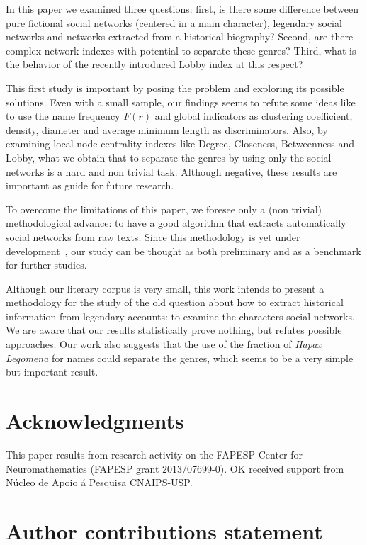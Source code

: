 \documentclass[review]{elsarticle}
\begin{document}
In this paper we examined  three questions:  first, is there
some difference  between  pure  fictional  social  networks
(centered in a main character), legendary social networks
and  networks  extracted from  a historical  biography?
Second, are there complex network indexes 
with potential to separate these genres?  Third,  what  is the
behavior of the  recently introduced Lobby index at this respect?

This first study is important by posing the problem and
exploring its possible solutions.
Even with a small sample, our findings seems 
to refute some ideas like to use the
name frequency $F(r)$ and global indicators as 
clustering coefficient, density, 
diameter and average minimum length as discriminators. 
Also, by examining local node centrality indexes like 
Degree, Closeness, Betweenness and Lobby,
what we obtain that to separate the genres by
using only the social networks is a hard and non trivial task.
Although negative, these results are important as guide
for future research.

To overcome the limitations of this paper, 
we foresee only a (non trivial)
methodological advance: to have a good algorithm that 
extracts automatically social networks from raw texts. 
Since this methodology is yet under
development~\cite{elson2010extracting,grayson2016sense}, 
our study can be thought as both 
preliminary and as a benchmark for further studies.

Although our literary corpus is very small, this work
intends to present a methodology for the study of the
old question about how to extract historical information from
legendary accounts: to examine the characters social networks. 
We are aware that our results statistically 
prove nothing, but refutes possible approaches.
Our work also suggests  that the
use of the fraction of \emph{Hapax Legomena} 
for names could separate the genres, 
which seems to be a very simple but important result. 

\section*{Acknowledgments}
This paper results from research activity on the 
FAPESP Center for Neuromathematics (FAPESP grant 2013/07699-0). 
OK received support from N\'ucleo de Apoio \'a Pesquisa 
CNAIPS-USP. 

\section*{Author contributions statement}
\end{document}
